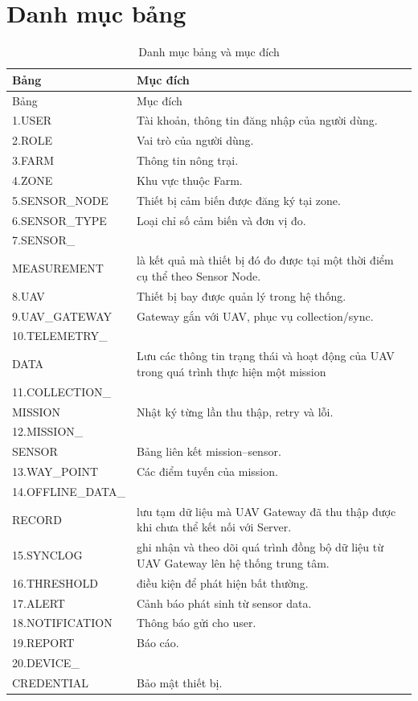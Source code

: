 \section{Danh mục bảng}
\begin{longtable}{p{4cm}p{10cm}}
\caption{Danh mục bảng và mục đích}\label{tab:tables}\\
\toprule
Bảng & Mục đích\\
\midrule
\endfirsthead
\toprule
Bảng & Mục đích\\
\midrule
\endhead
1.USER & Tài khoản, thông tin đăng nhập của người dùng.\\
2.ROLE & Vai trò của người dùng.\\
3.FARM & Thông tin nông trại.\\
4.ZONE & Khu vực thuộc Farm.\\
5.SENSOR\_NODE & Thiết bị cảm biến được đăng ký tại zone.\\
6.SENSOR\_TYPE & Loại chỉ số cảm biến và đơn vị đo.\\
7.SENSOR\_\\MEASUREMENT & là kết quả mà thiết bị đó đo được tại một thời điểm cụ thể theo Sensor Node.\\
8.UAV & Thiết bị bay được quản lý trong hệ thống.\\
9.UAV\_GATEWAY & Gateway gắn với UAV, phục vụ collection/sync.\\
10.TELEMETRY\_\\DATA & Lưu các thông tin trạng thái và hoạt động của UAV trong quá trình thực hiện một mission\\
11.COLLECTION\_\\MISSION& Nhật ký từng lần thu thập, retry và lỗi.\\
12.MISSION\_\\SENSOR & Bảng liên kết mission--sensor.\\
13.WAY\_POINT & Các điểm tuyến của mission.\\
14.OFFLINE\_DATA\_\\RECORD & lưu tạm dữ liệu mà UAV Gateway đã thu thập được khi chưa thể kết nối với Server.\\
15.SYNCLOG & ghi nhận và theo dõi quá trình đồng bộ dữ liệu từ UAV Gateway lên hệ thống trung tâm.\\
16.THRESHOLD & điều kiện để phát hiện bất thường.\\
17.ALERT & Cảnh báo phát sinh từ sensor data.\\
18.NOTIFICATION & Thông báo gửi cho user.\\
19.REPORT & Báo cáo.\\
20.DEVICE\_\\CREDENTIAL & Bảo mật thiết bị.\\
\bottomrule
\end{longtable}
